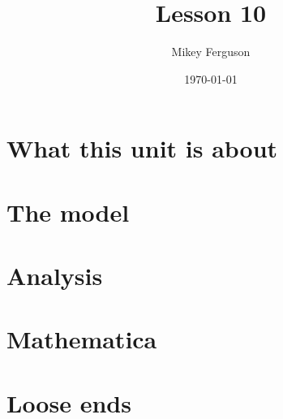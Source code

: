 \documentclass[11pt]{article}
\title{Lesson 10}
\author{Mikey Ferguson}
\date{\today}
\begin{document}
\maketitle
\tableofcontents
\bigskip

\section{What this unit is about}

\section{The model}

\section{Analysis}

\section{Mathematica}

\section{Loose ends}
\end{document}
